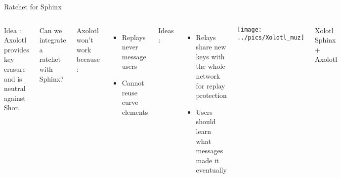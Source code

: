 \documentclass[fleqn,xcolor={usenames,dvipsnames}]{beamer}
\begin{document}
\begin{frame}[t]{Ratchet for Sphinx}
\begin{columns}[T]

Idea : Axolotl provides key erasure
\hspace*{5pt} and is neutral against Shor. %

\medskip

Can we integrate a ratchet with Sphinx?

\medskip
Axolotl won't work because : 
\begin{itemize}
\item Replays never message users
\item Cannot reuse curve elements
\end{itemize}

\medskip
Ideas : 
\begin{itemize}
\item Relays share new keys with the whole network for replay protection \\
\item Users should learn what messages made it eventually
\end{itemize}

\texttt{[image: ../pics/Xolotl\_muz]}
\begin{center}
Xolotl \\
Sphinx + Axolotl
\end{center}
\end{columns}

\end{frame}
\end{document}
